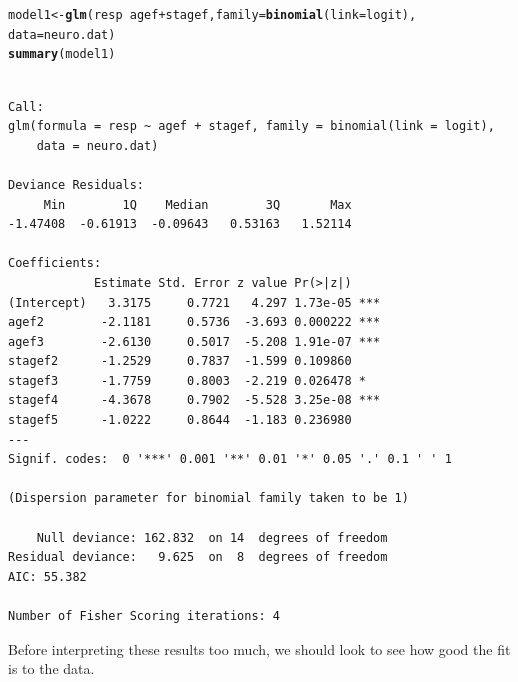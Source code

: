 \documentclass[oneside]{book}\usepackage[]{graphicx}\usepackage[svgnames]{xcolor}
\makeatletter
\newcommand{\hlopt}[1]{\textcolor[rgb]{0,0,0}{#1}}%
\newcommand{\hlstd}[1]{\textcolor[rgb]{0.345,0.345,0.345}{#1}}%
\newcommand{\hlkwb}[1]{\textcolor[rgb]{0.69,0.353,0.396}{#1}}%
\newcommand{\hlkwc}[1]{\textcolor[rgb]{0.333,0.667,0.333}{#1}}%
\newcommand{\hlkwd}[1]{\textcolor[rgb]{0.737,0.353,0.396}{\textbf{#1}}}%
\newenvironment{kframe}{%
 \def\at@end@of@kframe{}%
 \ifinner\ifhmode%
  \def\at@end@of@kframe{\end{minipage}}%
  \begin{minipage}{\columnwidth}%
 \fi\fi%
 \def\FrameCommand##1{\hskip\@totalleftmargin \hskip-\fboxsep
 \colorbox{shadecolor}{##1}\hskip-\fboxsep
     \hskip-\linewidth \hskip-\@totalleftmargin \hskip\columnwidth}%
 \MakeFramed {\advance\hsize-\width
   \@totalleftmargin\z@ \linewidth\hsize
   \@setminipage}}%
 {\par\unskip\endMakeFramed%
 \at@end@of@kframe}
\newenvironment{knitrout}{}{} %
\makeatother
\begin{document}
\begin{knitrout}
\color{fgcolor}\begin{kframe}
\begin{alltt}
\hlstd{model1} \hlkwb{<-} \hlkwd{glm}\hlstd{(resp} \hlopt{~} \hlstd{agef} \hlopt{+} \hlstd{stagef,} \hlkwc{family} \hlstd{=} \hlkwd{binomial}\hlstd{(}\hlkwc{link} \hlstd{= logit),}
  \hlkwc{data} \hlstd{= neuro.dat)}
\hlkwd{summary}\hlstd{(model1)}
\end{alltt}
\begin{verbatim}

Call:
glm(formula = resp ~ agef + stagef, family = binomial(link = logit), 
    data = neuro.dat)

Deviance Residuals: 
     Min        1Q    Median        3Q       Max  
-1.47408  -0.61913  -0.09643   0.53163   1.52114  

Coefficients:
            Estimate Std. Error z value Pr(>|z|)    
(Intercept)   3.3175     0.7721   4.297 1.73e-05 ***
agef2        -2.1181     0.5736  -3.693 0.000222 ***
agef3        -2.6130     0.5017  -5.208 1.91e-07 ***
stagef2      -1.2529     0.7837  -1.599 0.109860    
stagef3      -1.7759     0.8003  -2.219 0.026478 *  
stagef4      -4.3678     0.7902  -5.528 3.25e-08 ***
stagef5      -1.0222     0.8644  -1.183 0.236980    
---
Signif. codes:  0 '***' 0.001 '**' 0.01 '*' 0.05 '.' 0.1 ' ' 1

(Dispersion parameter for binomial family taken to be 1)

    Null deviance: 162.832  on 14  degrees of freedom
Residual deviance:   9.625  on  8  degrees of freedom
AIC: 55.382

Number of Fisher Scoring iterations: 4
\end{verbatim}
\end{kframe}
\end{knitrout}
Before interpreting these results too much, we should look to see how good the fit is to
the data.
\end{document}
